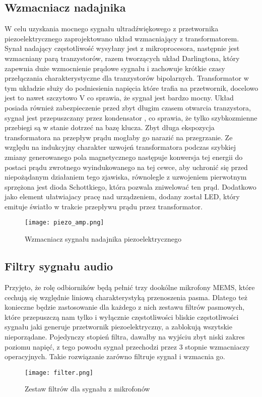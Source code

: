\subsection{Wzmacniacz nadajnika}
W celu uzyskania mocnego sygnału ultradźwiękowego z przetwornika piezoelektrycznego zaprojektowano układ wzmacniający z transformatorem. 
Synał nadający częstotliwość wysyłany jest z mikroprocesora, następnie jest wzmacniany parą tranzystorów, razem tworzących układ Darlingtona, 
który zapewnia duże wzmocnienie prądowe sygnału i zachowuje krótkie czasy przełączania charakterystyczne dla tranzystorów bipolarnych.
Transformator w tym układzie służy do podniesienia napięcia które trafia na przetwornik, docelowo jest to nawet szczytowo \unit[80]{V} co sprawia, 
że sygnał jest bardzo mocny.
Układ posiada również zabezpieczenie przed zbyt długim czasem otwarcia tranzystora, sygnał jest przepuszczany przez kondensator , 
co sprawia, że tylko szybkozmienne przebiegi są w stanie dotrzeć na bazę klucza. 
Zbyt długa ekspozycja transformatora na przepływ prądu mogłaby go narazić na przegrzanie.
Ze względu na indukcyjny charakter uzwojeń transformatora podczas szybkiej zmiany generowanego pola magnetycznego następuje 
konwersja tej energii do postaci prądu zwrotnego wyindukowanego na tej cewce, aby uchronić się przed niepożądanym działaniem tego zjawiska, 
równolegle z uzwojeniem pierwotnym sprzężona jest dioda Schottkiego, która pozwala zniwelować ten prąd.
Dodatkowo jako element ułatwiajacy pracę nad urządzeniem, dodany został LED, który emituje światło w trakcie przepływu prądu przez transformator.
\begin{figure}[ht!]
    \centering
    \texttt{[image: piezo\_amp.png]}
    \caption{Wzmacniacz sygnału nadajnika piezoelektrycznego}
    \label{fig:piezo_amp}
\end{figure}

\subsection{Filtry sygnału audio}

Przyjęto, że rolę odbiorników będą pełnić trzy dookólne mikrofony MEMS, które cechują się względnie liniową charakterystyką przenoszenia pasma. 
Dlatego też konieczne będzie zastosowanie dla każdego z nich zestawu filtrów pasmowych, które przepuszczą nam tylko i wyłącznie częstotliwości bliskie częstotliwości 
sygnału jaki generuje przetwornik piezoelektryczny, a zablokują wszytskie nieporządane. 
Pojedynczy stopień filtra, dawałby na wyjściu zbyt niski zakres poziomu napięć, 
z tego powodu sygnał przechodzi przez 3 stopnie wzmacniaczy operacyjnych. Takie rozwiązanie zarówno filtruje sygnał i wzmacnia go.
\begin{figure}[ht!]
    \centering
    \texttt{[image: filter.png]}
    \caption{Zestaw filtrów dla sygnału z mikrofonów}
    \label{fig:filter}
\end{figure}

